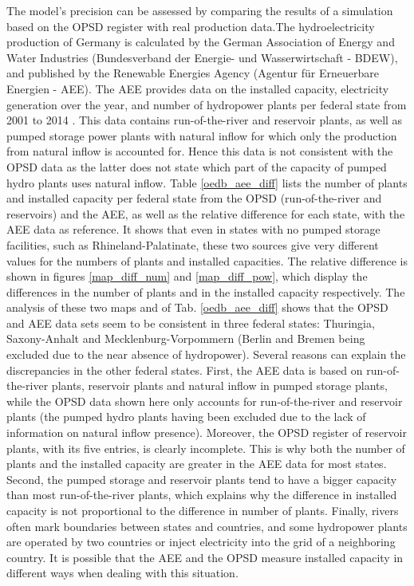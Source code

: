 The model's precision can be assessed by comparing the results of a simulation based on the OPSD register with real production data.\newline The hydroelectricity production of Germany is calculated by the German Association of Energy and Water Industries (Bundesverband der Energie- und Wasserwirtschaft - BDEW), and published by the Renewable Energies Agency (Agentur für Erneuerbare Energien - AEE). The AEE provides data on the installed capacity, electricity generation over the year, and number of hydropower plants per federal state from 2001 to 2014 \cite{aee}. This data contains run-of-the-river and reservoir plants, as well as pumped storage power plants with natural inflow for which only the production from natural inflow is accounted for. Hence this data is not consistent with the OPSD data as the latter does not state which part of the capacity of pumped hydro plants uses natural inflow. \newline
Table \ref{oedb_aee_diff} lists the number of plants and installed capacity per federal state from the OPSD (run-of-the-river and reservoirs) and the AEE, as well as the relative difference for each state, with the AEE data as reference. It shows that even in states with no pumped storage facilities, such as Rhineland-Palatinate, these two sources give very different values for the numbers of plants and installed capacities. \newline
The relative difference is shown in figures \ref{map_diff_num} and \ref{map_diff_pow}, which display the differences in the number of plants and in the installed capacity respectively. The analysis of these two maps and of Tab. \ref{oedb_aee_diff} shows that the OPSD and AEE data sets seem to be consistent in three federal states: Thuringia, Saxony-Anhalt and Mecklenburg-Vorpommern (Berlin and Bremen being excluded due to the near absence of hydropower). Several reasons can explain the discrepancies in the other federal states. First, the AEE data is based on run-of-the-river plants, reservoir plants and natural inflow in pumped storage plants, while the OPSD data shown here only accounts for run-of-the-river and reservoir plants (the pumped hydro plants having been excluded due to the lack of information on natural inflow presence). Moreover, the OPSD register of reservoir plants, with its five entries, is clearly incomplete. This is why both the number of plants and the installed capacity are greater in the AEE data for most states. Second, the pumped storage and reservoir plants tend to have a bigger capacity than most run-of-the-river plants, which explains why the difference in installed capacity is not proportional to the difference in number of plants. Finally, rivers often mark boundaries between states and countries, and some hydropower plants are operated by two countries or inject electricity into the grid of a neighboring country. It is possible that the AEE and the OPSD measure installed capacity in different ways when dealing with this situation.

